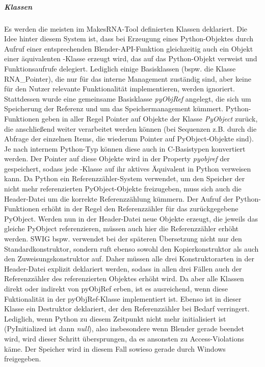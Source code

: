 \subparagraph{Klassen}

Es werden die meisten im MakesRNA-Tool definierten Klassen deklariert. Die Idee hinter diesem System ist, dass bei Erzeugung eines Python-Objektes durch Aufruf einer entsprechenden Blender-API-Funktion gleichzeitig auch ein Objekt einer äquivalenten \CC-Klasse erzeugt wird, das auf das Python-Objekt verweist und Funktionsaufrufe delegiert. Lediglich einige Basisklassen (bspw. die Klasse RNA\_Pointer), die nur für das interne Management zuständig sind, aber keine für den Nutzer relevante Funktionalität implementieren, werden ignoriert. Stattdessen wurde eine gemeinsame Basisklasse \emph{pyObjRef} angelegt, die sich um Speicherung der Referenz und um das Speichermanagement kümmert. Python-Funktionen geben in aller Regel Pointer auf Objekte der Klasse \emph{PyObject} zurück, die anschließend weiter verarbeitet werden können (bei Sequenzen z.B. durch die Abfrage der einzelnen Items, die wiederum Pointer auf PyObject-Objekte sind). Je nach internem Python-Typ können diese auch in C-Basistypen konvertiert werden. Der Pointer auf diese Objekte wird in der Property \emph{pyobjref} der gespeichert, sodass jede \CC-Klasse auf ihr aktives Äquivalent in Python verweisen kann. Da Python ein Referenzzähler-System verwendet, um den Speicher der nicht mehr referenzierten PyObject-Objekte freizugeben, muss sich auch die Header-Datei um die korrekte Referenzzählung kümmern. Der Aufruf der Python-Funktionen erhöht in der Regel den Referenzzähler für das zurückgegebene PyObject. Werden nun in der Header-Datei neue Objekte erzeugt, die jeweils das gleiche PyObject referenzieren, müssen auch hier die Referenzzähler erhöht werden. SWIG bspw. verwendet bei der späteren Übersetzung nicht nur den Standardkonstruktor, sondern ruft ebenso sowohl den Kopierkonstruktor als auch den Zuweisungskonstruktor auf. Daher müssen alle drei Konstruktorarten in der Header-Datei explizit deklariert werden, sodass in allen drei Fällen auch der Referenzzähler des referenzierten Objektes erhöht wird. Da aber alle Klassen direkt oder indirekt von pyObjRef erben, ist es ausreichend, wenn diese Fuktionalität in der pyObjRef-Klasse implementiert ist. Ebenso ist in dieser Klasse ein Destruktor deklariert, der den Referenzzähler bei Bedarf verringert. Lediglich, wenn Python zu diesem Zeitpunkt nicht mehr initialisiert ist (PyInitialized ist dann \emph{null}), also insbesondere wenn Blender gerade beendet wird, wird dieser Schritt übersprungen, da es ansonsten zu Access-Violations käme. Der Speicher wird in diesem Fall sowieso gerade durch Windows freigegeben.

